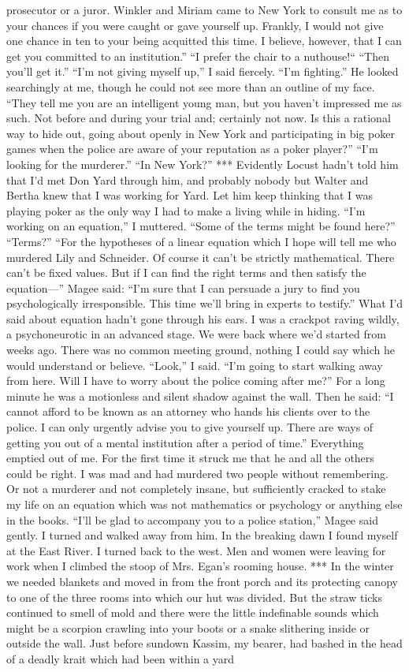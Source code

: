 \documentclass{novel}
\begin{document}
prosecutor or a juror. Winkler and Miriam came to New York to consult me as to your chances if you were caught or gave yourself up. Frankly, I would not give one chance in ten to your being acquitted this time. I believe, however, that I can get you committed to an institution.” “I prefer the chair to a nuthouse!“ “Then you’ll get it.” “I’m not giving myself up,” I said fiercely. “I’m fighting.” He looked searchingly at me, though he could not see more than an outline of my face. “They tell me you are an intelligent young man, but you haven’t impressed me as such. Not before and during your trial and; certainly not now. Is this a rational way to hide out, going about openly in New York and participating in big poker games when the police are aware of your reputation as a poker player?” “I’m looking for the murderer.” “In New York?” *** Evidently Locust hadn’t told him that I’d met Don Yard through him, and probably nobody but Walter and Bertha knew that I was working for Yard. Let him keep thinking that I was playing poker as the only way I had to make a living while in hiding. “I’m working on an equation,” I muttered. “Some of the terms might be found here?” “Terms?” “For the hypotheses of a linear equation which I hope will tell me who murdered Lily and Schneider. Of course it can’t be strictly mathematical. There can’t be fixed values. But if I can find the right terms and then satisfy the equation—” Magee said: “I’m sure that I can persuade a jury to find you psychologically irresponsible. This time we’ll bring in experts to testify.” What I’d said about equation hadn’t gone through his ears. I was a crackpot raving wildly, a psychoneurotic in an advanced stage. We were back where we’d started from weeks ago. There was no common meeting ground, nothing I could say which he would understand or believe. “Look,” I said. “I’m going to start walking away from here. Will I have to worry about the police coming after me?” For a long minute he was a motionless and silent shadow against the wall. Then he said: “I cannot afford to be known as an attorney who hands his clients over to the police. I can only urgently advise you to give yourself up. There are ways of getting you out of a mental institution after a period of time.” Everything emptied out of me. For the first time it struck me that he and all the others could be right. I was mad and had murdered two people without remembering. Or not a murderer and not completely insane, but sufficiently cracked to stake my life on an equation which was not mathematics or psychology or anything else in the books. “I’ll be glad to accompany you to a police station,” Magee said gently. I turned and walked away from him. In the breaking dawn I found myself at the East River. I turned back to the west. Men and women were leaving for work when I climbed the stoop of Mrs. Egan’s rooming house. *** In the winter we needed blankets and moved in from the front porch and its protecting canopy to one of the three rooms into which our hut was divided. But the straw ticks continued to smell of mold and there were the little indefinable sounds which might be a scorpion crawling into your boots or a snake slithering inside or outside the wall. Just before sundown Kassim, my bearer, had bashed in the head of a deadly krait which had been within a yard 
\end{document}
